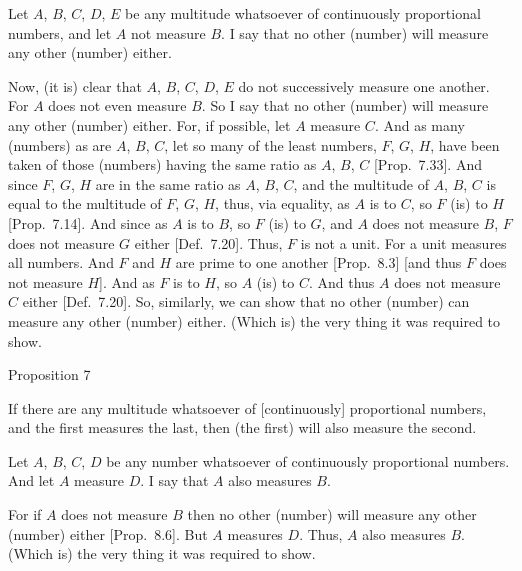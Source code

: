  \epsfysize=2in
\centerline{}

 Let $A$, $B$, $C$, $D$, $E$ be any multitude whatsoever of continuously
 proportional numbers, and let $A$ not measure $B$.  I say that 
 no other (number) will measure any other (number) either.
 
 Now, (it is) clear that $A$, $B$, $C$, $D$, $E$ do not successively measure
 one another. For $A$ does not even measure $B$. So I say that  
 no other (number) will measure any other (number) either. For, if possible, let $A$ measure
 $C$. And as many (numbers) as  are $A$, $B$, $C$, let  so many of the least numbers,
 $F$, $G$, $H$, have been taken of those (numbers) having the same ratio as $A$, $B$, $C$ [Prop.~7.33]. And since $F$, $G$, $H$ are in the same ratio as $A$, $B$, $C$, and the multitude of
 $A$, $B$, $C$ is equal to the multitude of $F$, $G$, $H$, thus, via
 equality, as $A$ is to $C$, so $F$ (is) to $H$ [Prop.~7.14]. And since as $A$ is to $B$, so $F$ (is) to $G$, and $A$ does not measure $B$, $F$ does not measure $G$ either
 [Def.~7.20]. Thus, $F$ is not a unit. For a unit measures all numbers. And $F$ and $H$ are prime to one another [Prop.~8.3] [and thus $F$ does not measure $H$].
 And as $F$ is to $H$, so $A$ (is) to $C$. And thus $A$ does not measure
 $C$ either [Def.~7.20]. So, similarly, we can show
 that no other (number) can measure any other (number) either.
 (Which is) the very thing it was required to show.


\begin{center}
{\large Proposition 7}
\end{center}

If there are any multitude whatsoever of [continuously] proportional numbers, and the first measures the last, then (the first)
will also measure the second.

\epsfysize=1.2in
\centerline{}

Let $A$, $B$, $C$, $D$ be any number whatsoever of continuously proportional numbers. And let $A$ measure $D$. I say that $A$ also measures $B$.

For if $A$ does not measure $B$ then no other (number) will measure
any other (number) either [Prop.~8.6]. 
But $A$ measures $D$. Thus, $A$ also measures $B$. (Which is) the
very thing it was required to show.


